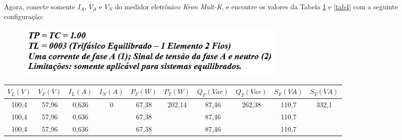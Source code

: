 \documentclass[a4paper,12pt,oneside,openany,table,xcdraw]{article}
\begin{document}
Agora, conecte somente $I_A$, $V_A$ e $V_N$ do medidor eletrônico \emph{Kron Mult-K}, e encontre os valores da Tabela \ref{tab3} e \ref{tab4} com a seguinte configuração: 
\begin{figure}[H]
\centering
\captionsetup{font=scriptsize}
\includegraphics[width=13.5cm]{parametros2}
\end{figure}


\begin{table}[H]\scriptsize
\centering
\def\arraystretch{1.35}
\captionsetup{font=scriptsize}
 \label{tab3}

\begin{tabular}{|c|c|c|c|c|c|c|c|c|c|}
\hline
$V_{L} (V)$ & $V_{F} (V)$ & $I_{L} (A)$ & $I_{N} (A)$        & $P_{F} (W)$ & $P_{T} (W)$             & $Q_{F} (Var)$ & $Q_{T} (Var)$           & $S_{F} (VA)$ & $S_{T} (VA)$           \\ \hline
100,4       & 57,96          & 0,636       & \multirow{3}{*}{0} & 67,38       & \multirow{3}{*}{202,14} & 87,46         & \multirow{3}{*}{262,38} & 110,7        & \multirow{3}{*}{332,1} \\ \cline{1-3} \cline{5-5} \cline{7-7} \cline{9-9}
100,4       & 57,96          & 0,636       &                    & 67,38       &                         & 87,46         &                         & 110,7        &                        \\ \cline{1-3} \cline{5-5} \cline{7-7} \cline{9-9}
100,4       & 57,96          & 0,636       &                    & 67,38       &                         & 87,46         &                         & 110,7        &                        \\ \hline
\end{tabular}
\end{table}
\end{document}
